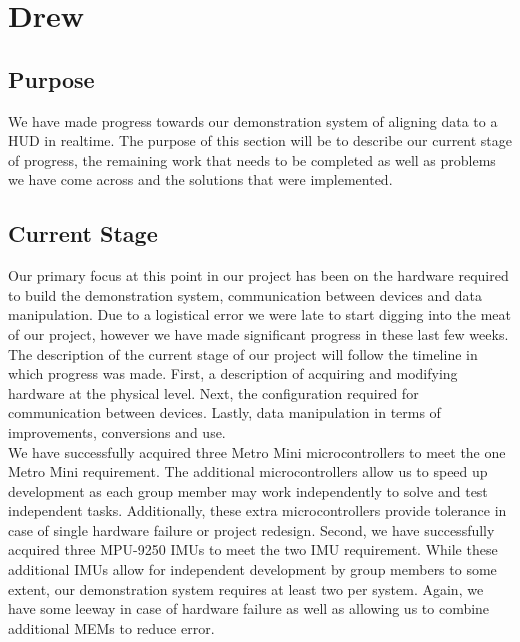 \section{Drew}
\subsection{Purpose}
We have made progress towards our demonstration system of aligning data to a HUD in realtime.
The purpose of this section will be to describe our current stage of progress, the remaining work that needs to be completed as well as problems we have come across and the solutions that were implemented.\\

\subsection{Current Stage}
Our primary focus at this point in our project has been on the hardware required to build the demonstration system, communication between devices and data manipulation.
Due to a logistical error we were late to start digging into the meat of our project, however we have made significant progress in these last few weeks.
The description of the current stage of our project will follow the timeline in which progress was made.
First, a description of acquiring and modifying hardware at the physical level.
Next, the configuration required for communication between devices.
Lastly, data manipulation in terms of improvements, conversions and use.\\

We have successfully acquired three Metro Mini microcontrollers to meet the one Metro Mini requirement.
The additional microcontrollers allow us to speed up development as each group member may work independently to solve and test independent tasks.
Additionally, these extra microcontrollers provide tolerance in case of single hardware failure or project redesign.
Second, we have successfully acquired three MPU-9250 IMUs to meet the two IMU requirement.
While these additional IMUs allow for independent development by group members to some extent, our demonstration system requires at least two per system.
Again, we have some leeway in case of hardware failure as well as allowing us to combine additional MEMs to reduce error.\\

